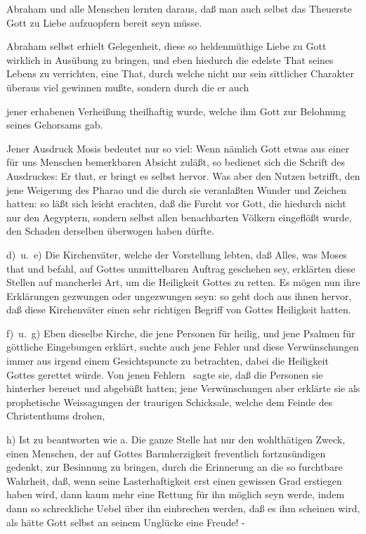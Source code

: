 \begin{aufzb}
\begin{aufzc}
\item Abraham und alle Menschen lernten daraus, daß man auch selbst das Theuerste Gott zu Liebe aufzuopfern bereit seyn müsse.
\item Abraham selbst erhielt Gelegenheit, diese so heldenmüthige Liebe zu Gott wirklich in Ausübung zu bringen, und eben hiedurch die edelste That seines Lebens zu verrichten, eine That, durch welche nicht nur sein sittlicher Charakter überaus viel gewinnen mußte, sondern durch die er auch
\item jener erhabenen Verheißung theilhaftig wurde, welche ihm Gott zur Belohnung seines Gehorsams gab.
\end{aufzc}
\item Jener Ausdruck Mosis bedeutet nur so viel:  Wenn nämlich Gott etwas aus einer für uns Menschen bemerkbaren Absicht zuläßt, so bedienet sich die Schrift des Ausdruckes: Er thut, er bringt es selbst hervor. Was aber den Nutzen betrifft, den jene Weigerung des Pharao und die durch sie veranlaßten Wunder und Zeichen hatten: so läßt sich leicht erachten, daß die Furcht vor Gott, die hiedurch nicht nur den Aegyptern, sondern selbst allen benachbarten Völkern eingeflößt wurde, den Schaden derselben überwogen haben dürfte.
\item[d)~u.~e)] Die Kirchenväter, welche der Vorstellung lebten, daß Alles, was Moses that und befahl, auf Gottes unmittelbaren Auftrag geschehen sey, erklärten diese Stellen auf mancherlei Art, um die Heiligkeit Gottes zu retten. Es mögen nun ihre Erklärungen gezwungen oder ungezwungen seyn: so geht doch aus ihnen hervor, daß diese Kirchenväter einen sehr richtigen Begriff von Gottes Heiligkeit hatten.~
\item[f)~u.~g)] Eben dieselbe Kirche, die jene Personen für heilig, und jene Psalmen für göttliche Eingebungen erklärt, suchte auch jene Fehler und diese Verwünschungen immer aus irgend einem Gesichtspuncte zu betrachten, dabei die Heiligkeit Gottes gerettet würde. Von jenen Fehlern \zB\ sagte sie, daß die Personen sie hinterher bereuet und abgebüßt hatten; jene Verwünschungen aber erklärte sie als prophetische Weissagungen der traurigen Schicksale, welche dem Feinde des Christenthums drohen, \udgl\ 
\item[h)] Ist zu beantworten wie a. Die ganze Stelle hat nur den wohlthätigen Zweck, einen Menschen, der auf Gottes Barmherzigkeit freventlich fortzusündigen gedenkt, zur Besinnung zu bringen, durch die Erinnerung an die so furchtbare Wahrheit, daß, wenn seine Lasterhaftigkeit erst einen gewissen Grad erstiegen haben wird, dann kaum mehr eine Rettung für ihn möglich seyn werde, indem dann so schreckliche Uebel über ihn einbrechen werden, daß es ihm scheinen wird, als hätte Gott selbst an seinem Unglücke eine Freude! -

\end{aufzb}
